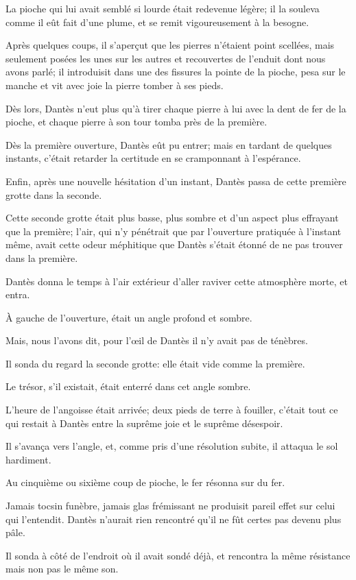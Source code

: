 La pioche qui lui avait semblé si lourde était redevenue légère; il la souleva comme il eût fait d'une plume, et se remit vigoureusement à la besogne.

Après quelques coups, il s'aperçut que les pierres n'étaient point scellées, mais seulement posées les unes sur les autres et recouvertes de l'enduit dont nous avons parlé; il introduisit dans une des fissures la pointe de la pioche, pesa sur le manche et vit avec joie la pierre tomber à ses pieds.

Dès lors, Dantès n'eut plus qu'à tirer chaque pierre à lui avec la dent de fer de la pioche, et chaque pierre à son tour tomba près de la première.

Dès la première ouverture, Dantès eût pu entrer; mais en tardant de quelques instants, c'était retarder la certitude en se cramponnant à l'espérance.

Enfin, après une nouvelle hésitation d'un instant, Dantès passa de cette première grotte dans la seconde.

Cette seconde grotte était plus basse, plus sombre et d'un aspect plus effrayant que la première; l'air, qui n'y pénétrait que par l'ouverture pratiquée à l'instant même, avait cette odeur méphitique que Dantès s'était étonné de ne pas trouver dans la première.

Dantès donna le temps à l'air extérieur d'aller raviver cette atmosphère morte, et entra.

À gauche de l'ouverture, était un angle profond et sombre.

Mais, nous l'avons dit, pour l'œil de Dantès il n'y avait pas de ténèbres.

Il sonda du regard la seconde grotte: elle était vide comme la première.

Le trésor, s'il existait, était enterré dans cet angle sombre.

L'heure de l'angoisse était arrivée; deux pieds de terre à fouiller, c'était tout ce qui restait à Dantès entre la suprême joie et le suprême désespoir.

Il s'avança vers l'angle, et, comme pris d'une résolution subite, il attaqua le sol hardiment.

Au cinquième ou sixième coup de pioche, le fer résonna sur du fer.

Jamais tocsin funèbre, jamais glas frémissant ne produisit pareil effet sur celui qui l'entendit. Dantès n'aurait rien rencontré qu'il ne fût certes pas devenu plus pâle.

Il sonda à côté de l'endroit où il avait sondé déjà, et rencontra la même résistance mais non pas le même son.

